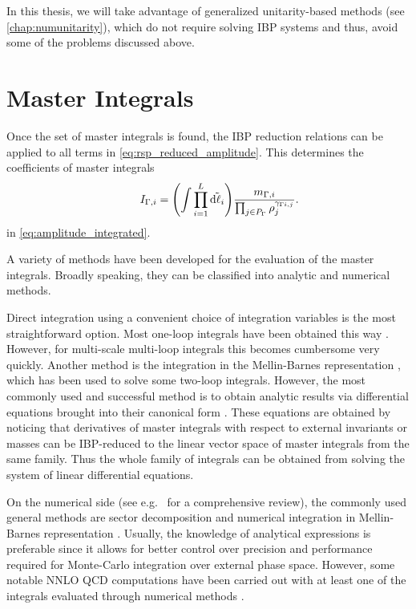 In this thesis, we will take advantage of generalized unitarity-based methods (see \cref{chap:numunitarity}),
which do not require solving IBP systems and thus,
avoid some of the problems discussed above.

\section{Master Integrals}

Once the set of master integrals is found, the IBP reduction relations can be applied 
to all terms in \cref{eq:rsp_reduced_amplitude}.
This determines the coefficients of master integrals
\begin{equation} \label{eq:master_integrals}
    \qquad I_{\Gamma,i} = 
    \qty(\int \prod_{i=1}^{L} \tilde{\dd{\ell_i}}) \frac{m_{\Gamma,i}}{\prod_{j\in P_\Gamma} \rho_j^{\gamma_{\Gamma i,j}}}.
\end{equation}
in \cref{eq:amplitude_integrated}.

A variety of methods have been developed for the evaluation of the master integrals.
Broadly speaking, they can be classified into analytic and numerical methods.

Direct integration using a convenient choice of integration variables is the most straightforward option.
Most one-loop integrals have been obtained this way \cite{vanHameren:2010cp,Ellis:2007qk,tHooft:1978jhc,Denner:2010tr}.
However, for multi-scale multi-loop integrals this becomes  cumbersome   very quickly.
Another method is the integration in the Mellin-Barnes  representation  \cite{Smirnov:1999gc,Tausk:1999vh,Dubovyk:2017cqw}, which
has been used to solve some two-loop integrals.
However, the most commonly used and successful method is to obtain analytic results via
differential equations \cite{Kotikov:1990kg,Remiddi:1997ny,Gehrmann:1999as,Henn:2013pwa,Argeri:2007up,Henn:2014qga}
brought into their canonical form \cite{Henn:2013pwa}.
These equations are obtained by noticing that
derivatives of master integrals with respect to
external invariants or masses can be IBP-reduced to the linear vector space of master integrals from the same family.
Thus the whole family of integrals can be obtained from solving the system of linear differential equations.

On the numerical side (see e.g.\ \cite{Freitas:2016sty} for a comprehensive review),
the commonly used general methods are sector decomposition \cite{Binoth:2000ps,Binoth:2003ak}
and numerical integration in Mellin-Barnes representation \cite{Czakon:2005rk,Anastasiou:2005cb}.
Usually, the knowledge of analytical expressions is preferable since it allows for better control over
precision and performance required for Monte-Carlo integration over external phase space. However,
some notable NNLO QCD computations have been carried out with at least one of the integrals evaluated through numerical
methods \cite{Jones:2018hbb,Grazzini:2018bsd,Baglio:2018lrj}.

